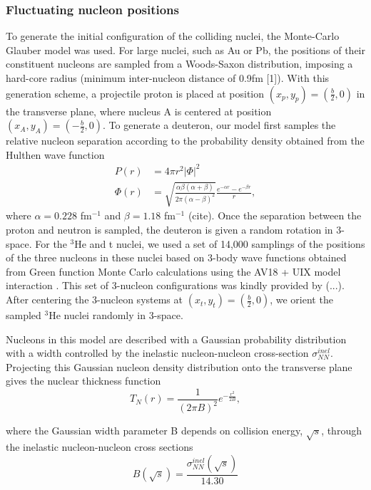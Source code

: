 \documentclass[preprint,showpacs,amsfonts,aps,prl,nofootinbib,floatfix]{revtex4}
\begin{document}
\subsubsection{Fluctuating nucleon positions}
\label{sec2a1}
To generate the initial configuration of the colliding nuclei, the Monte-Carlo Glauber model was used. For large nuclei, such as Au or Pb, the positions of their constituent nucleons are sampled from a Woods-Saxon distribution, imposing a hard-core radius (minimum inter-nucleon distance of 0.9fm [1]). With this generation scheme, a projectile proton is placed at position $(x_p,y_p)=(\frac{b}{2},0)$ in the transverse plane, where nucleus A is centered at position $(x_A,y_A)=(-\frac{b}{2},0)$. 
To generate a deuteron, our model first samples the relative nucleon separation according to the probability density obtained from the Hulthen wave function
\begin{align} 
\label{eq:HulthenPDF}
	P(r)&=4\pi r^2 |\Phi|^2\\
	\Phi(r)&=\sqrt{\frac{\alpha \beta(\alpha+\beta)}{2\pi(\alpha-\beta)^2}}\frac{e^{-\alpha r}-e^{-\beta r}}{r},
\end{align}
where $\alpha = 0.228$ fm$^{-1}$ and $\beta = 1.18$ fm$^{-1}$ (cite). Once the separation between the proton and neutron is sampled, the deuteron is given a random rotation in 3-space.
For the $^3$He and t nuclei, we used a set of 14,000 samplings of the positions of the three nucleons in these nuclei based on 3-body wave functions obtained from Green function Monte Carlo calculations using the AV18 + UIX model interaction \cite{Carlson:1997qn}. This set of 3-nucleon configurations was kindly provided by (...). After centering the 3-nucleon systems at $(x_t,y_t) = (\frac{b}{2},0)$, we orient the sampled $^3$He nuclei randomly in 3-space.

Nucleons in this model are described with a Gaussian probability distribution with a width controlled by the inelastic nucleon-nucleon cross-section $\sigma_{NN}^{inel}$. Projecting this Gaussian nucleon density distribution onto the transverse plane gives the nuclear thickness function \cite{Shen:2014vra}
\begin{equation} 
	T_{N}(r) = \frac{1}{(2\pi B)^2}e^{-\frac{r^2}{2B}},
\end{equation}

where the Gaussian width parameter B depends on collision energy, $\sqrt{s}$, through the inelastic nucleon-nucleon cross sections
\begin{equation}
	B(\sqrt{s}) = \frac{\sigma_{NN}^{inel}(\sqrt{s})}{14.30}
\end{equation}
\end{document}
